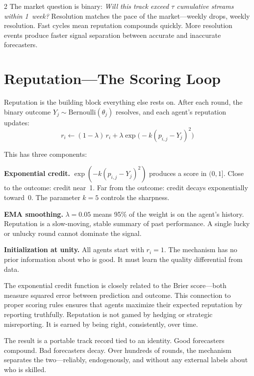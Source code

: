 \documentclass[9pt,oneside]{amsart}
\begin{document}
\begin{multicols}{2}
The market question is binary: \emph{Will this track exceed $\tau$ cumulative streams within 1~week?} Resolution matches the pace of the market---weekly drops, weekly resolution. Fast cycles mean reputation compounds quickly. More resolution events produce faster signal separation between accurate and inaccurate forecasters.

\section{Reputation---The Scoring Loop}

Reputation is the building block everything else rests on. After each round, the binary outcome $Y_j \sim \text{Bernoulli}(\theta_j)$ resolves, and each agent's reputation updates:
\begin{equation}
  r_i \leftarrow (1 - \lambda)\, r_i + \lambda \exp\!\big(-k(p_{i,j} - Y_j)^2\big)
\end{equation}

This has three components:

\textbf{Exponential credit.} $\exp(-k(p_{i,j} - Y_j)^2)$ produces a score in $(0, 1]$. Close to the outcome: credit near~1. Far from the outcome: credit decays exponentially toward~0. The parameter $k = 5$ controls the sharpness.

\textbf{EMA smoothing.} $\lambda = 0.05$ means 95\% of the weight is on the agent's history. Reputation is a slow-moving, stable summary of past performance. A single lucky or unlucky round cannot dominate the signal.

\textbf{Initialization at unity.} All agents start with $r_i = 1$. The mechanism has no prior information about who is good. It must learn the quality differential from data.

The exponential credit function is closely related to the Brier score---both measure squared error between prediction and outcome. This connection to proper scoring rules ensures that agents maximize their expected reputation by reporting truthfully. Reputation is not gamed by hedging or strategic misreporting. It is earned by being right, consistently, over time.

The result is a portable track record tied to an identity. Good forecasters compound. Bad forecasters decay. Over hundreds of rounds, the mechanism separates the two---reliably, endogenously, and without any external labels about who is skilled.


\end{multicols}
\end{document}
